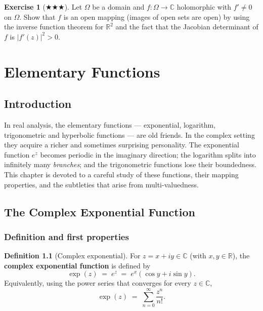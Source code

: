 \documentclass[12pt,a4paper,openany]{book}
\theoremstyle{definition}
\newtheorem{definition}{Definition}[chapter]
\newtheorem{exercise}{Exercise}[chapter]
\theoremstyle{plain}
\theoremstyle{remark}
\newcommand{\C}{\mathbb{C}}
\newcommand{\R}{\mathbb{R}}
\newcommand{\abs}[1]{\left|#1\right|}
\begin{document}
\begin{exercise}[$\bigstar\!\bigstar\!\bigstar$]
\label{exo:ch2-14}
Let $\Omega$ be a domain and $f:\Omega\to\C$ holomorphic with $f'\neq 0$ on $\Omega$. Show that $f$ is an open mapping (images of open sets are open) by using the inverse function theorem for $\R^2$ and the fact that the Jacobian determinant of $f$ is $\abs{f'(z)}^2 > 0$.
\end{exercise}

\chapter{Elementary Functions}
\label{chap:elementary-functions}

\section*{Introduction}

In real analysis, the elementary functions --- exponential, logarithm,
trigonometric and hyperbolic functions --- are old friends.  In the complex
setting they acquire a richer and sometimes surprising personality.  The
exponential function $e^z$ becomes periodic in the imaginary direction; the
logarithm splits into infinitely many \emph{branches}; and the trigonometric
functions lose their boundedness.  This chapter is devoted to a careful study
of these functions, their mapping properties, and the subtleties that arise
from multi-valuedness.

\section{The Complex Exponential Function}
\label{sec:complex-exp}

\subsection{Definition and first properties}

\begin{definition}[Complex exponential]\label{def:complex-exp}
For $z = x + iy \in \C$ (with $x,y\in\R$), the \textbf{complex exponential
function} is defined by
\[
  \exp(z) \;=\; e^z \;=\; e^x(\cos y + i\sin y).
\]
Equivalently, using the power series that converges for every $z\in\C$,
\[
  \exp(z) \;=\; \sum_{n=0}^{\infty} \frac{z^n}{n!}.
\]
\end{definition}
\end{document}
